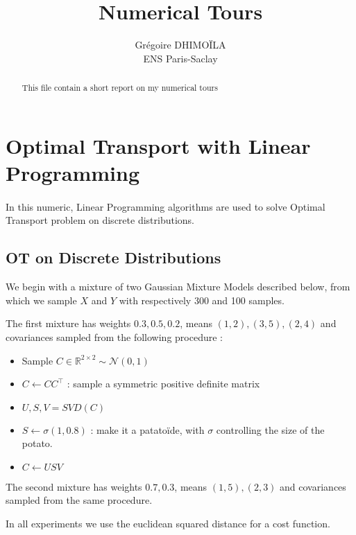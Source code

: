 \documentclass[a4paper,11pt]{article}
\newcommand{\R}{\mathbb{R}}
\newcommand{\1}{\mathbbm{1}}
\begin{document}
\title{Numerical Tours}
\author{
    Grégoire DHIMOÏLA \\
    ENS Paris-Saclay
}
\maketitle

\begin{abstract}
    This file contain a short report on my numerical tours
\end{abstract}

\section{Optimal Transport with Linear Programming}
\label{sec:OT_LP}

\paragraph{} In this numeric, Linear Programming algorithms are used to solve Optimal Transport problem on discrete distributions.

\subsection{OT on Discrete Distributions}

We begin with a mixture of two Gaussian Mixture Models described below, from which we sample $X$ and $Y$ with respectively 300 and 100 samples.

The first mixture has weights $0.3, 0.5, 0.2$, means $(1, 2), (3, 5), (2, 4)$ and covariances sampled from the following procedure :
\begin{itemize}
    \item Sample $C \in \R^{2\times2} \sim \mathcal{N(0, 1)}$
    \item $C \leftarrow C C^{\top}$ : sample a symmetric positive definite matrix
    \item $U, S, V = SVD(C)$
    \item $S \leftarrow \sigma (1, 0.8)$ : make it a patatoïde, with $\sigma$ controlling the size of the potato.
    \item $C \leftarrow U S V$
\end{itemize}

The second mixture has weights $0.7, 0.3$, means $(1, 5), (2, 3)$ and covariances sampled from the same procedure.

In all experiments we use the euclidean squared distance for a cost function.
\end{document}
